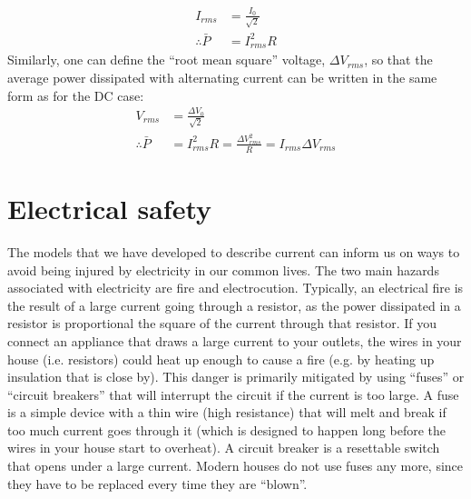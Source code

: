 \begin{align*}
I_{rms}&=\frac{I_0}{\sqrt 2}\\
\therefore\bar P&=I_{rms}^2R
\end{align*}
Similarly, one can define the ``root mean square'' voltage, $\Delta V_{rms}$, so that the average power dissipated with alternating current can be written in the same form as for the DC case:
\begin{align*}
V_{rms}&=\frac{\Delta V_0}{\sqrt 2}\\
\therefore\bar P&=I_{rms}^2R =\frac{\Delta V_{rms}^2}{R}=I_{rms}\Delta V_{rms}
\end{align*}

\section{Electrical safety}
The models that we have developed to describe current can inform us on ways to avoid being injured by electricity in our common lives. The two main hazards associated with electricity are fire and electrocution. Typically, an electrical fire is the result of a large current going through a resistor, as the power dissipated in a resistor is proportional the square of the current through that resistor. If you connect an appliance that draws a large current to your outlets, the wires in your house (i.e. resistors) could heat up enough to cause a fire (e.g. by heating up insulation that is close by). This danger is primarily mitigated by using ``fuses'' or ``circuit breakers'' that will interrupt the circuit if the current is too large. A fuse is a simple device with a thin wire (high resistance) that will melt and break if too much current goes through it (which is designed to happen long before the wires in your house start to overheat). A circuit breaker is a resettable switch that opens under a large current. Modern houses do not use fuses any more, since they have to be replaced every time they are ``blown''.

